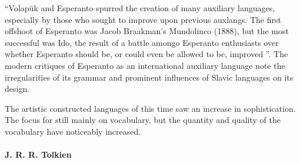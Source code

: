 \documentclass[14pt, a4paper]{extreport}
\begin{document}
``Volapük and Esperanto spurred the creation of many auxiliary languages, especially by those who sought to improve upon previous auxlangs. The first offshoot of Esperanto was Jacob Braakman's Mundolinco (1888), but the most successful was Ido, the result of a battle amongo Esperanto enthusiasts over whether Esperanto should be, or could even be allowed to be, improved \parencite{sanders}''. The modern critiques of Esperanto as an international auxiliary language note the irregularities of its grammar and prominent influences of Slavic languages on its design.

The artistic constructed languages of this time saw an increase in sophistication. The focus for still mainly on vocabulary, but the quantity and quality of the vocabulary have noticeably increased.
        \paragraph{J. R. R. Tolkien}

%


\end{document}
